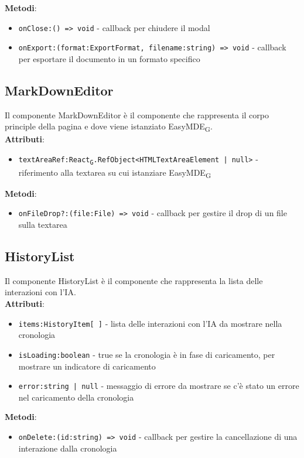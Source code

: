 \documentclass[11pt,a4paper]{article}
\newcommand{\gls}[1]{#1\textsubscript{G}}
\begin{document}
\textbf{Metodi}:
\begin{itemize}
    \item \texttt{onClose:() => void} - callback per chiudere il modal
    \item \texttt{onExport:(format:ExportFormat, filename:string) => void} - callback per esportare il documento in un formato specifico
\end{itemize}

\subsection{MarkDownEditor}
Il componente MarkDownEditor è il componente che rappresenta il corpo principle della pagina e dove viene istanziato \gls{EasyMDE}.\\

\textbf{Attributi}:
\begin{itemize}
    \item \texttt{textAreaRef:\gls{React}.RefObject<HTMLTextAreaElement | null>} - riferimento alla textarea su cui istanziare \gls{EasyMDE}
    
\end{itemize}

\textbf{Metodi}:
\begin{itemize}
    \item \texttt{onFileDrop?:(file:File) => void} - callback per gestire il drop di un file sulla textarea
\end{itemize}

\subsection{HistoryList}
Il componente HistoryList è il componente che rappresenta la lista delle interazioni con l'IA.\\

\textbf{Attributi}:
\begin{itemize}
    \item \texttt{items:HistoryItem[ ]} - lista delle interazioni con l'IA da mostrare nella cronologia
    \item \texttt{isLoading:boolean} - true se la cronologia è in fase di caricamento, per mostrare un indicatore di caricamento
    \item \texttt{error:string | null} - messaggio di errore da mostrare se c'è stato un errore nel caricamento della cronologia
\end{itemize}

\textbf{Metodi}:
\begin{itemize}
    \item \texttt{onDelete:(id:string) => void} - callback per gestire la cancellazione di una interazione dalla cronologia
\end{itemize}
\end{document}
